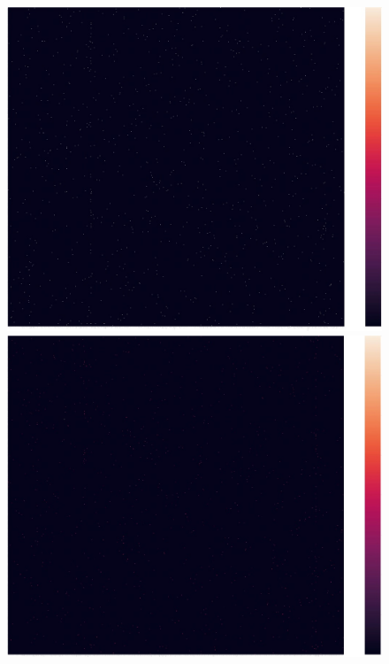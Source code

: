 \documentclass[12pt,%
               a4paper,%
               oneside,openany,%
               titlepage,%
               headinclude,footinclude,%
               BCOR5mm,%
               cleardoublepage=empty,%
               tablecaptionabove,%
               floatperchapter,
               ]{scrreprt}                 %
\begin{document}
\begin{figure}[ht]
\begin{minipage}[b]{0.5\linewidth}
    \centering
    \includegraphics[width=.9\linewidth]{Figures/Matrix_delta.jpg}
    \vspace{4ex}
  \end{minipage}
    \begin{minipage}[b]{0.5\linewidth}
    \centering
    \includegraphics[width=.9\linewidth]{Figures/Matrix_pfizer.jpg}
    \vspace{4ex}
  \end{minipage}
  \begin{minipage}[b]{0.5\linewidth}
    \centering

\end{minipage}
\end{figure}
\end{document}
